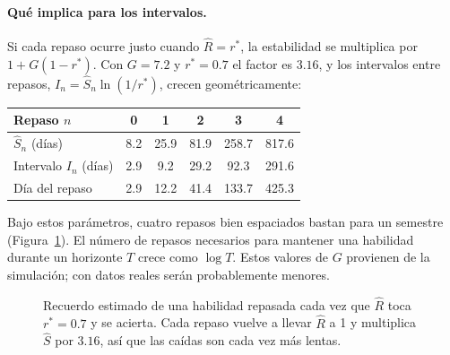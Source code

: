 \documentclass[11pt]{article}
\theoremstyle{definition}
\theoremstyle{remark}
\newcommand{\Rh}{\hat R}
\newcommand{\Sh}{\hat S}
\newcommand{\rstar}{r^{\ast}}
\begin{document}
\paragraph{Qué implica para los intervalos.} Si cada repaso ocurre justo cuando $\Rh=\rstar$, la estabilidad se multiplica por $1+G(1-\rstar)$. Con $G=7.2$ y $\rstar=0.7$ el factor es $3.16$, y los intervalos entre repasos, $I_n=\Sh_n\ln(1/\rstar)$, crecen geométricamente:

\begin{center}\small
\begin{tabular}{@{}lccccc@{}}
\toprule
Repaso $n$ & 0 & 1 & 2 & 3 & 4 \\
\midrule
$\Sh_n$ (días) & 8.2 & 25.9 & 81.9 & 258.7 & 817.6 \\
Intervalo $I_n$ (días) & 2.9 & 9.2 & 29.2 & 92.3 & 291.6 \\
Día del repaso & 2.9 & 12.2 & 41.4 & 133.7 & 425.3 \\
\bottomrule
\end{tabular}
\end{center}

Bajo estos parámetros, cuatro repasos bien espaciados bastan para un semestre (Figura~\ref{fig:sierra}). El número de repasos necesarios para mantener una habilidad durante un horizonte $T$ crece como $\log T$. Estos valores de $G$ provienen de la simulación; con datos reales serán probablemente menores.

\begin{figure}[t]
\centering
{}
\caption{Recuerdo estimado de una habilidad repasada cada vez que $\Rh$ toca $\rstar=0.7$ y se acierta. Cada repaso vuelve a llevar $\Rh$ a 1 y multiplica $\Sh$ por $3.16$, así que las caídas son cada vez más lentas.}
\label{fig:sierra}
\end{figure}
\end{document}
